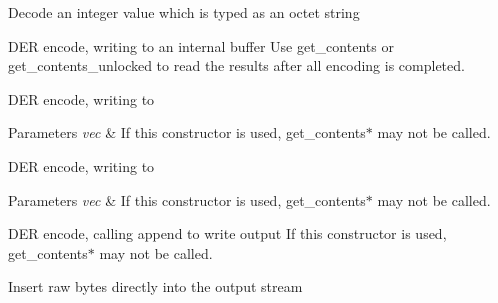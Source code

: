 Decode an integer value which is typed as an octet string

D\+ER encode, writing to an internal buffer Use get\+\_\+contents or get\+\_\+contents\+\_\+unlocked to read the results after all encoding is completed.

D\+ER encode, writing to
\begin{DoxyParams}{Parameters}
{\em vec} & If this constructor is used, get\+\_\+contents$\ast$ may not be called.\\
\hline
\end{DoxyParams}
D\+ER encode, writing to
\begin{DoxyParams}{Parameters}
{\em vec} & If this constructor is used, get\+\_\+contents$\ast$ may not be called.\\
\hline
\end{DoxyParams}
D\+ER encode, calling append to write output If this constructor is used, get\+\_\+contents$\ast$ may not be called.

Insert raw bytes directly into the output stream

